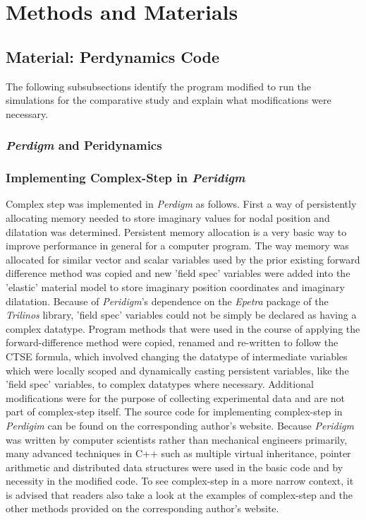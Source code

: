\documentclass[preprint,12pt]{elsarticle}
\begin{document}
\section{Methods and Materials} 

\subsection{Material: Perdynamics Code}

The following subsubsections identify the program modified to run the simulations for the
comparative study and explain what modifications were necessary.

\subsubsection{\emph{Perdigm} and Peridynamics} 
\subsubsection{Implementing Complex-Step in \emph{Peridigm}} 

Complex step was implemented in \emph{Perdigm} as follows. First a way of
persistently allocating memory needed to store imaginary values for nodal
position and dilatation was determined. Persistent memory allocation is a very
basic way to improve performance in general for a computer program. The way
memory was allocated for similar vector and scalar variables used by the prior
existing forward difference method was copied and new 'field spec' variables
were added into the 'elastic' material model to store imaginary position
coordinates and imaginary dilatation. Because of \emph{Peridigm}'s dependence
on the \emph{Epetra} package of the \emph{Trilinos} library, 'field spec'
variables could not be simply be declared as having a complex datatype. Program
methods that were used in the course of applying the forward-difference method
were copied, renamed and re-written to follow the CTSE formula, which involved
changing the datatype of intermediate variables which were locally scoped and
dynamically casting persistent variables, like the 'field spec' variables, to
complex datatypes where necessary. Additional modifications were for the
purpose of collecting experimental data and are not part of complex-step
itself. The source code for implementing complex-step in \emph{Perdigim} can be
found on the corresponding author's website.  Because \emph{Peridigm} was
written by computer scientists rather than mechanical engineers primarily, many
advanced techniques in C++ such as multiple virtual inheritance, pointer
arithmetic and distributed data structures were used in the basic code and by
necessity in the modified code.  To see complex-step in a more narrow context,
it is advised that readers also take a look at the examples of complex-step and
the other methods provided on the corresponding author's website.
\end{document}
